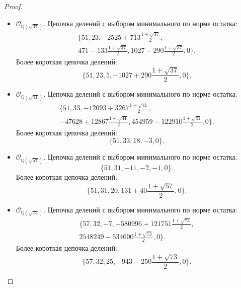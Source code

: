 \documentclass[_00_dissertation.tex]{subfiles}
\begin{document}
\begin{proof}
\begin{itemize}
        \item $\mathcal{O}_{\mathbb{Q}(\sqrt{37})}$.
        Цепочка делений с выбором минимального по норме остатка:
        \begin{multline*}
            \{51, 23, -2525+713\frac{1+\sqrt{37}}{2},\\
            471-133\frac{1+\sqrt{37}}{2}, 1027-290\frac{1+\sqrt{37}}{2}, 0\}.
        \end{multline*}
        Более короткая цепочка делений:
        \begin{equation*}
            \{51, 23, 5, -1027+290\frac{1+\sqrt{37}}{2}, 0\}.
        \end{equation*}
    
        \item $\mathcal{O}_{\mathbb{Q}(\sqrt{41})}$.
        Цепочка делений с выбором минимального по норме остатка:
        \begin{multline*}
            \{51, 33, -12093+3267\frac{1+\sqrt{41}}{2},\\
            -47628+12867\frac{1+\sqrt{41}}{2}, 454959-122910\frac{1+\sqrt{41}}{2}, 0\}.
        \end{multline*}
        Более короткая цепочка делений:
        \begin{equation*}
            \{51, 33, 18, -3, 0\}.
        \end{equation*}
    
        \item $\mathcal{O}_{\mathbb{Q}(\sqrt{57})}$.
        Цепочка делений с выбором минимального по норме остатка:
        \begin{equation*}
            \{51, 31, -11, -2, -1, 0\}.
        \end{equation*}
        Более короткая цепочка делений:
        \begin{equation*}
            \{51, 31, 20, 131+40\frac{1+\sqrt{57}}{2}, 0\}.
        \end{equation*}
    
        \item $\mathcal{O}_{\mathbb{Q}(\sqrt{73})}$.
        Цепочка делений с выбором минимального по норме остатка:
        \begin{multline*}
            \{57, 32, -7, -580996+121751\frac{1+\sqrt{73}}{2},\\
            2548249-534000\frac{1+\sqrt{73}}{2}, 0\}.
        \end{multline*}
        Более короткая цепочка делений:
        \begin{equation*}
            \{57, 32, 25, -943-250\frac{1+\sqrt{73}}{2}, 0\}.
        \end{equation*}
    \end{itemize}
    
\end{proof}
\end{document}
